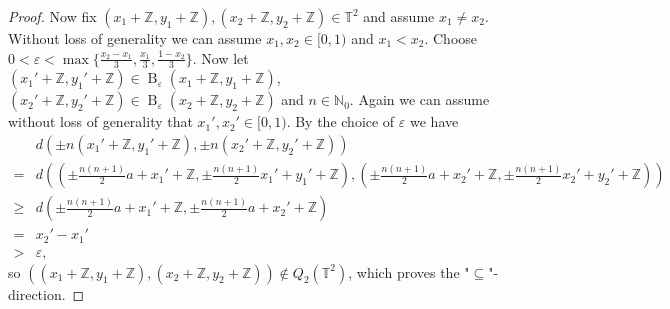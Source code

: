 \begin{proof}
	Now fix $(x_1 + \mathbb{Z}, y_1 + \mathbb{Z}), (x_2 + \mathbb{Z}, y_2 + \mathbb{Z}) \in \mathbb{T}^2$ and assume $x_1 \neq x_2$. Without loss of generality we can assume $x_1, x_2 \in [0, 1)$ and $x_1 < x_2$. Choose $0 < \varepsilon < \max\{\frac{x_2-x_1}{3}, \frac{x_1}{3}, \frac{1 - x_2}{3}\}$. Now let $(x_1' + \mathbb{Z}, y_1' + \mathbb{Z}) \in \operatorname{B}_\varepsilon(x_1 + \mathbb{Z}, y_1 + \mathbb{Z})$, $(x_2' + \mathbb{Z}, y_2' + \mathbb{Z}) \in \operatorname{B}_\varepsilon(x_2 + \mathbb{Z}, y_2 + \mathbb{Z})$ and $n \in \mathbb{N}_0$. Again we can assume without loss of generality that $x_1', x_2' \in [0, 1)$. By the choice of $\varepsilon$ we have
	\begin{align*}
		&d(\pm n(x_1' + \mathbb{Z}, y_1' + \mathbb{Z}), \pm n(x_2' + \mathbb{Z}, y_2' + \mathbb{Z}))\\
		= &d((\pm \frac{n(n+1)}{2}a + x_1' + \mathbb{Z}, \pm \frac{n(n+1)}{2} x_1' + y_1' + \mathbb{Z}), (\pm \frac{n(n+1)}{2}a + x_2' + \mathbb{Z}, \pm \frac{n(n+1)}{2} x_2' + y_2' + \mathbb{Z}))\\
		\geq &d(\pm \frac{n(n+1)}{2} a + x_1' + \mathbb{Z}, \pm \frac{n(n+1)}{2} a + x_2' + \mathbb{Z})\\
		= &x_2' - x_1'\\
		> &\varepsilon,
	\end{align*}
	so $((x_1 + \mathbb{Z}, y_1 + \mathbb{Z}), (x_2 + \mathbb{Z}, y_2 + \mathbb{Z})) \notin Q_2(\mathbb{T}^2)$, which proves the "$\subseteq$"-direction.
\end{proof}
